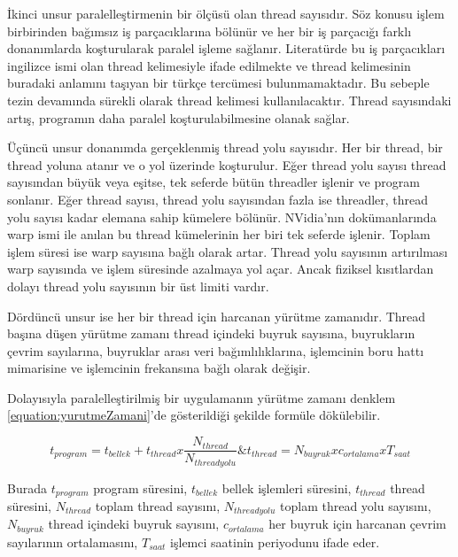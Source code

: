 İkinci unsur paralelleştirmenin bir ölçüsü olan thread sayısıdır. Söz konusu işlem birbirinden bağımsız iş parçacıklarına bölünür ve her bir iş parçacığı farklı donanımlarda koşturularak paralel işleme sağlanır. Literatürde bu iş parçacıkları ingilizce ismi olan thread kelimesiyle ifade edilmekte ve thread kelimesinin buradaki anlamını taşıyan bir türkçe tercümesi bulunmamaktadır. Bu sebeple tezin devamında sürekli olarak thread kelimesi kullanılacaktır. Thread sayısındaki artış, programın daha paralel koşturulabilmesine olanak sağlar.\par

Üçüncü unsur donanımda gerçeklenmiş thread yolu sayısıdır. Her bir thread, bir thread yoluna atanır ve o yol üzerinde koşturulur. Eğer thread yolu sayısı thread sayısından büyük veya eşitse, tek seferde bütün threadler işlenir ve program sonlanır. Eğer thread sayısı, thread yolu sayısından fazla ise threadler, thread yolu sayısı kadar elemana sahip kümelere bölünür. NVidia'nın dokümanlarında warp ismi ile anılan bu thread kümelerinin her biri tek seferde işlenir. Toplam işlem süresi ise warp sayısına bağlı olarak artar. Thread yolu sayısının artırılması warp sayısında ve işlem süresinde azalmaya yol açar. Ancak fiziksel kısıtlardan dolayı thread yolu sayısının bir üst limiti vardır. \par

Dördüncü unsur ise her bir thread için harcanan yürütme zamanıdır. Thread başına düşen yürütme zamanı thread içindeki buyruk sayısına, buyrukların çevrim sayılarına, buyruklar arası veri bağımlılıklarına, işlemcinin boru hattı mimarisine ve işlemcinin frekansına bağlı olarak değişir.\par

Dolayısıyla paralelleştirilmiş bir uygulamanın yürütme zamanı denklem \ref{equation:yurutmeZamani}'de gösterildiği şekilde formüle dökülebilir.

\begin{equation} \label{equation:yurutmeZamani}
t_{program} = t_{bellek} + t_{thread} x \frac{N_{thread}}{N_{thread yolu}} \& 
t_{thread} = N_{buyruk} x c_{ortalama} x T_{saat}
\end{equation} 

Burada $t_{program}$ program süresini, $t_{bellek}$ bellek işlemleri süresini, $t_{thread}$ thread süresini, $N_{thread}$ toplam thread sayısını, $N_{thread yolu}$ toplam thread yolu sayısını, $N_{buyruk}$ thread içindeki buyruk sayısını, $c_{ortalama}$ her buyruk için harcanan çevrim sayılarının ortalamasını, $T_{saat}$ işlemci saatinin periyodunu ifade eder.\par

